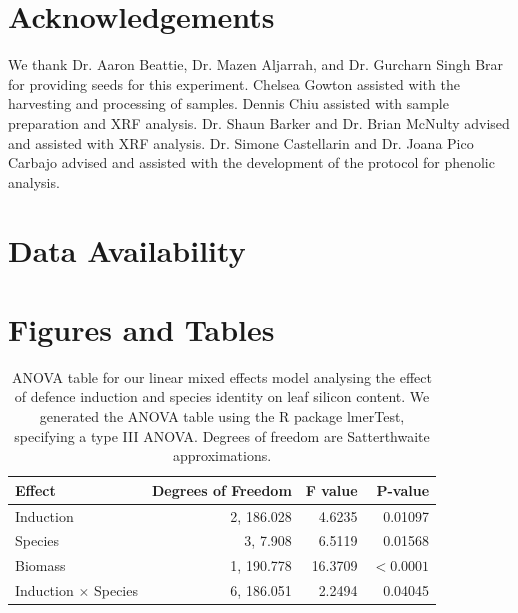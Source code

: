 \documentclass[12pt, letterpaper, ]{report}
\begin{document}
\section{Acknowledgements}

We thank Dr. Aaron Beattie, Dr. Mazen Aljarrah, and Dr. Gurcharn Singh Brar for providing seeds for this experiment. Chelsea Gowton assisted with the harvesting and processing of samples. Dennis Chiu assisted with sample preparation and XRF analysis. Dr. Shaun Barker and Dr. Brian McNulty advised and assisted with XRF analysis. Dr. Simone Castellarin and Dr. Joana Pico Carbajo advised and assisted with the development of the protocol for phenolic analysis. 

\section{Data Availability}

\printbibliography

\section{Figures and Tables}

\begin{table}[ht]
        \centering
        \caption{ANOVA table for our linear mixed effects model analysing the effect of defence induction and species identity on leaf silicon content. We generated the ANOVA table using the R package lmerTest, specifying a type III ANOVA. Degrees of freedom are Satterthwaite approximations.}
        \label{Tab:si_params}
        \begin{tabular}{lrrr}
               \hline
                \textbf{Effect} & \textbf{Degrees of Freedom} & \textbf{F value} &    \textbf{P-value} \\ 
                \hline   
                Induction         &  2, 186.028 &  4.6235 &   0.01097 \\  
                Species           &  3, 7.908 &  6.5119 &   0.01568 \\  
                Biomass            &  1, 190.778 & 16.3709 & $<0.0001$ \\
                Induction $\times$ Species  &    6, 186.051 &  2.2494 &   0.04045 \\  
                \hline
        \end{tabular}
\end{table}
\end{document}
